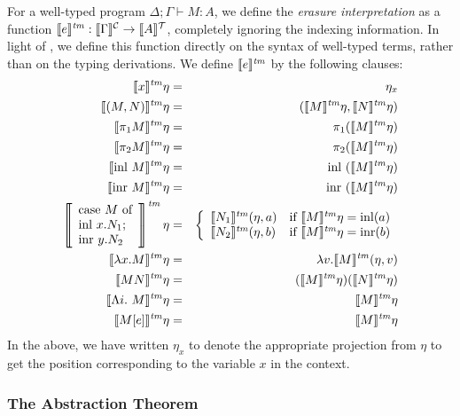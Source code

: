 For a well-typed program $\Delta; \Gamma \vdash M : A$, we define the
\emph{erasure interpretation} as a function $\llbracket e \rrbracket^{\mathit{tm}} :
\llbracket \Gamma \rrbracket^{\mathcal{C}} \to \llbracket A \rrbracket^{\mathcal{T}}$, completely ignoring the indexing
information. In light of , we define
this function directly on the syntax of well-typed terms, rather than
on the typing derivations. We define $\llbracket e \rrbracket^{\mathit{tm}}$ by the following
clauses:
\begin{eqnarray*}
  \tmSem{x}\eta & = & \eta_x \\
  \tmSem{(M,N)}\eta & = & (\tmSem{M}\eta, \tmSem{N}\eta) \\
  \tmSem{\pi_1M}\eta & = & \pi_1(\tmSem{M}\eta) \\
  \tmSem{\pi_2M}\eta & = & \pi_2(\tmSem{M}\eta) \\
  \tmSem{\mathrm{inl}\ M}\eta & = & \mathrm{inl}\ (\tmSem{M}\eta) \\
  \tmSem{\mathrm{inr}\ M}\eta & = & \mathrm{inr}\ (\tmSem{M}\eta) \\
  \left\llbracket
    \begin{array}{l}
      \textrm{case}\ M\ \textrm{of}\\
      \textrm{inl}\ x.N_1;\\
      \textrm{inr}\ y.N_2
    \end{array}\right\rrbracket^{\mathit{tm}}\eta & = &
  \left\{
    \begin{array}{ll}
      \tmSem{N_1}(\eta,a) & \textrm{if }\tmSem{M}\eta = \mathrm{inl}(a) \\
      \tmSem{N_2}(\eta,b) & \textrm{if }\tmSem{M}\eta = \mathrm{inr}(b)
    \end{array}
  \right. \\
  \tmSem{\lambda x. M}\eta & = & \lambda v. \tmSem{M}(\eta, v) \\
  \tmSem{M N}\eta & = & (\tmSem{M}\eta) (\tmSem{N}\eta) \\
  \tmSem{\Lambda i.\ M}\eta & = & \tmSem{M}\eta \\
  \tmSem{M[e]}\eta & = & \tmSem{M}\eta
\end{eqnarray*}
In the above, we have written $\eta_x$ to denote the appropriate
projection from $\eta$ to get the position corresponding to the
variable $x$ in the context.

\subsubsection{The Abstraction Theorem}
\label{sec:abstraction-theorem}

